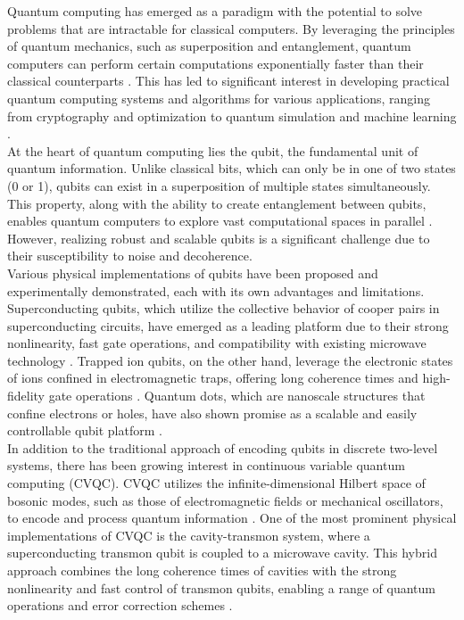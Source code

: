 \documentclass[12pt]{report}
\begin{document}
Quantum computing has emerged as a paradigm with the potential to solve problems that are intractable for classical computers. 
By leveraging the principles of quantum mechanics, such as superposition and entanglement, quantum computers can perform certain computations exponentially faster than their classical counterparts \cite{Nielsen2010}. 
This has led to significant interest in developing practical quantum computing systems and algorithms for various applications, ranging from cryptography and optimization to quantum simulation and machine learning \cite{Preskill2018}.
\\
At the heart of quantum computing lies the qubit, the fundamental unit of quantum information. 
Unlike classical bits, which can only be in one of two states (0 or 1), qubits can exist in a superposition of multiple states simultaneously. 
This property, along with the ability to create entanglement between qubits, enables quantum computers to explore vast computational spaces in parallel \cite{Nielsen2010}. 
However, realizing robust and scalable qubits is a significant challenge due to their susceptibility to noise and decoherence.
\\
Various physical implementations of qubits have been proposed and experimentally demonstrated, each with its own advantages and limitations. 
Superconducting qubits, which utilize the collective behavior of cooper pairs in superconducting circuits, have emerged as a leading platform due to their strong nonlinearity, fast gate operations, and compatibility with existing microwave technology \cite{Kjaergaard2020}. 
Trapped ion qubits, on the other hand, leverage the electronic states of ions confined in electromagnetic traps, offering long coherence times and high-fidelity gate operations \cite{Bruzewicz2019}. 
Quantum dots, which are nanoscale structures that confine electrons or holes, have also shown promise as a scalable and easily controllable qubit platform \cite{Chatterjee2021}.
\\
In addition to the traditional approach of encoding qubits in discrete two-level systems, there has been growing interest in continuous variable quantum computing (CVQC). 
CVQC utilizes the infinite-dimensional Hilbert space of bosonic modes, such as those of electromagnetic fields or mechanical oscillators, to encode and process quantum information \cite{Braunstein2005}. 
One of the most prominent physical implementations of CVQC is the cavity-transmon system, where a superconducting transmon qubit is coupled to a microwave cavity. This hybrid approach combines the long coherence times of cavities with the strong nonlinearity and fast control of transmon qubits, enabling a range of quantum operations and error correction schemes \cite{Ofek2016}.
\end{document}
